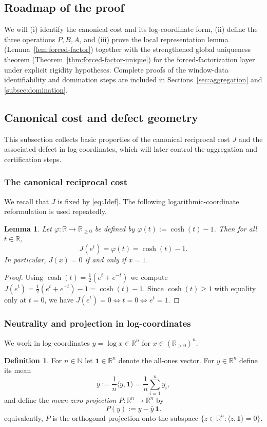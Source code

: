 \documentclass[11pt,reqno]{amsart}
\newtheorem{lemma}[theorem]{Lemma}
\theoremstyle{definition}
\newtheorem{definition}[theorem]{Definition}
\theoremstyle{remark}
\newcommand{\R}{\mathbb{R}}
\newcommand{\Rp}{\mathbb{R}_{>0}}
\newcommand{\1}{\mathbf{1}}
\begin{document}
\subsection{Roadmap of the proof}\label{subsec:roadmap}
We will (i) identify the canonical cost and its log-coordinate form,
(ii) define the three operations $P,B,A$, and (iii) prove the local representation lemma (Lemma~\ref{lem:forced-factor}) together with the strengthened global uniqueness theorem (Theorem~\ref{thm:forced-factor-unique}) for the forced-factorization layer under explicit rigidity hypotheses.
Complete proofs of the window-data identifiability and domination steps are included in Sections~\ref{sec:aggregation} and \ref{subsec:domination}. %

\subsection{Canonical cost and defect geometry}\label{sec:geometry} This subsection collects basic properties of the canonical reciprocal cost $J$ and the associated defect in log-coordinates, which will later control the aggregation and certification steps.

\subsubsection{The canonical reciprocal cost}
We recall that $J$ is fixed by \eqref{eq:Jdef}. The following logarithmic-coordinate reformulation is used repeatedly.
\begin{lemma}\label{lem:logform}
Let $\varphi:\R\to\R_{\geq 0}$ be defined by $\varphi(t):=\cosh(t)-1$.
Then for all $t\in\R$,
\[
J(e^t)=\varphi(t)=\cosh(t)-1.
\]
In particular, $J(x)=0$ if and only if $x=1$.
\end{lemma}

\begin{proof}
Using $\cosh(t)=\tfrac12(e^t+e^{-t})$ we compute
$J(e^t)=\tfrac12(e^t+e^{-t})-1=\cosh(t)-1$.
Since $\cosh(t)\geq 1$ with equality only at $t=0$, we have $J(e^t)=0\iff t=0\iff e^t=1$.
\end{proof}
\subsubsection{Neutrality and projection in log-coordinates}
We work in log-coordinates $y=\log x\in\R^n$ for $x\in(\Rp)^n$.
\begin{definition}\label{def:proj}
For $n\in\mathbb N$ let $\mathbf 1\in\R^n$ denote the all-ones vector. For $y\in\R^n$ define its mean
\[
\bar y:=\frac1n\langle y,\mathbf 1\rangle=\frac1n\sum_{i=1}^n y_i,
\]
and define the \emph{mean-zero projection} $P:\R^n\to\R^n$ by
\begin{equation}\label{eq:Pdef}
P(y):=y-\bar y\,\mathbf 1.
\end{equation}
equivalently, $P$ is the orthogonal projection onto the subspace $\{z\in\R^n:\langle z,\mathbf 1\rangle=0\}$.
\end{definition}
\end{document}
